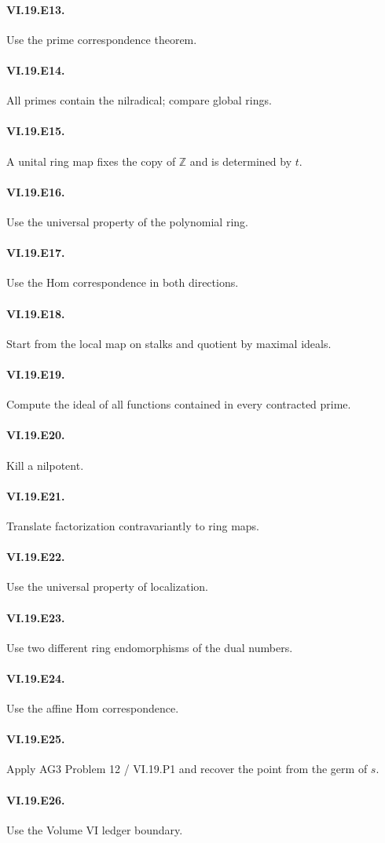 \paragraph{VI.19.E13.} Use the prime correspondence theorem.
\paragraph{VI.19.E14.} All primes contain the nilradical; compare global rings.
\paragraph{VI.19.E15.} A unital ring map fixes the copy of $\mathbb Z$ and is determined by $t$.
\paragraph{VI.19.E16.} Use the universal property of the polynomial ring.
\paragraph{VI.19.E17.} Use the Hom correspondence in both directions.
\paragraph{VI.19.E18.} Start from the local map on stalks and quotient by maximal ideals.
\paragraph{VI.19.E19.} Compute the ideal of all functions contained in every contracted prime.
\paragraph{VI.19.E20.} Kill a nilpotent.
\paragraph{VI.19.E21.} Translate factorization contravariantly to ring maps.
\paragraph{VI.19.E22.} Use the universal property of localization.
\paragraph{VI.19.E23.} Use two different ring endomorphisms of the dual numbers.
\paragraph{VI.19.E24.} Use the affine Hom correspondence.
\paragraph{VI.19.E25.} Apply AG3 Problem 12 / VI.19.P1 and recover the point from the germ of $s$.
\paragraph{VI.19.E26.} Use the Volume VI ledger boundary.
